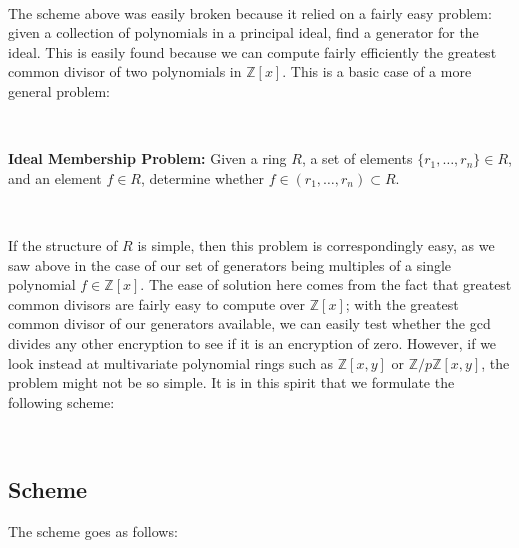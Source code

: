 \documentclass[11pt]{report}
\newcommand{\Z}{\mathbb{Z}}
\newcommand{\Zx}{\mathbb{Z}[x]}
\newcommand{\Zxy}{\mathbb{Z}[x,y]}
\newcommand{\Zpxy}{\mathbb{Z}/p\mathbb{Z}[x,y]}
\begin{document}
\

The scheme above was easily broken because it relied on a fairly easy problem: given a collection of polynomials in a principal ideal, find a generator for the ideal. This is easily found because we can compute fairly efficiently the greatest common divisor of two polynomials in $\Z[x]$. This is a basic case of a more general problem:

\

\textbf{Ideal Membership Problem:} Given a ring $R$, a set of elements $\{r_1,\dots,r_n\}\in R$, and an element $f\in R$, determine whether $f\in (r_1,\dots,r_n) \subset R$.

\

If the structure of $R$ is simple, then this problem is correspondingly easy, as we saw above in the case of our set of generators being multiples of a single polynomial $f\in \Zx$. The ease of solution here comes from the fact that greatest common divisors are fairly easy to compute over $\Zx$; with the greatest common divisor of our generators available, we can easily test whether the gcd divides any other encryption to see if it is an encryption of zero. However, if we look instead at multivariate polynomial rings such as $\Zxy$ or $\Zpxy$, the problem might not be so simple. It is in this spirit that we formulate the following scheme:

\

\subsection{Scheme}

The scheme goes as follows:
\end{document}
